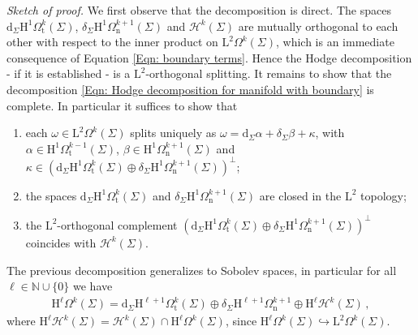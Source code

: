 \noindent\emph{Sketch of proof.} We first observe that the decomposition is direct. The spaces $\mathrm{d}_\Sigma \mathrm{H}^1\Omega^k_{\mathrm{t}}(\Sigma)$, $\delta_\Sigma \mathrm{H}^1\Omega^{k+1}_{\mathrm{n}}(\Sigma)$ and $\mathcal{H}^k(\Sigma)$ are mutually orthogonal to each other with respect to the inner product on $\mathrm{L}^2\Omega^k(\Sigma)$, which is an immediate consequence of Equation \eqref{Eqn: boundary terms}. Hence the Hodge
decomposition - if it is established - is a $\mathrm{L}^2$-orthogonal splitting. It remains to show that the decomposition \eqref{Eqn: Hodge decomposition for manifold with boundary} is complete. In particular it suffices to show that
\begin{enumerate}
	\item each $\omega\in\mathrm{L}^2\Omega^k(\Sigma)$ splits uniquely as $\omega=\mathrm{d}_\Sigma\alpha+\delta_\Sigma\beta+\kappa$, with $\alpha\in \mathrm{H}^1\Omega^{k-1}_{\mathrm{t}}(\Sigma)$, $\beta\in\mathrm{H}^1\Omega^{k+1}_{\mathrm{n}}(\Sigma)$ and $\kappa\in\left(\mathrm{d}_\Sigma \mathrm{H}^1\Omega^k_{\mathrm{t}}(\Sigma)\oplus
	\delta_\Sigma \mathrm{H}^1\Omega^{k+1}_{\mathrm{n}}(\Sigma)\right)^\perp$;
	\item the spaces $\mathrm{d}_\Sigma \mathrm{H}^1\Omega^k_{\mathrm{t}}(\Sigma)$ and $\delta_\Sigma \mathrm{H}^1\Omega^{k+1}_{\mathrm{n}}(\Sigma)$ are closed in the $\mathrm{L}^2$ topology;
	\item the $\mathrm{L}^2$-orthogonal complement $\left(\mathrm{d}_\Sigma \mathrm{H}^1\Omega^k_{\mathrm{t}}(\Sigma)\oplus
	\delta_\Sigma \mathrm{H}^1\Omega^{k+1}_{\mathrm{n}}(\Sigma)\right)^\perp$ coincides with $\mathcal{H}^k(\Sigma)$.
\end{enumerate}


\begin{remark}
		The previous decomposition generalizes to Sobolev spaces, in particular for all $\ell\in\mathbb{N}\cup\{0\}$ we have
		\begin{align}\label{Eqn: Hodge decomposition for manifold with boundary for Sobolev spaces}
			\mathrm{H}^\ell\Omega^k(\Sigma)=\mathrm{d}_\Sigma \mathrm{H}^{\ell+1}\Omega^k_{\mathrm{t}}(\Sigma)\oplus\delta_\Sigma \mathrm{H}^{\ell+1}\Omega^{k+1}_{\mathrm{n}}\oplus
			\mathrm{H}^\ell \mathcal{H}^k(\Sigma)\,,		
		\end{align}
		where $\mathrm{H}^\ell \mathcal{H}^k(\Sigma)=\mathcal{H}^k(\Sigma)\cap\mathrm{H}^\ell\Omega^k(\Sigma)$, since $\mathrm{H}^\ell\Omega^k(\Sigma)\hookrightarrow\mathrm{L}^2\Omega^k(\Sigma)$.
\end{remark}


